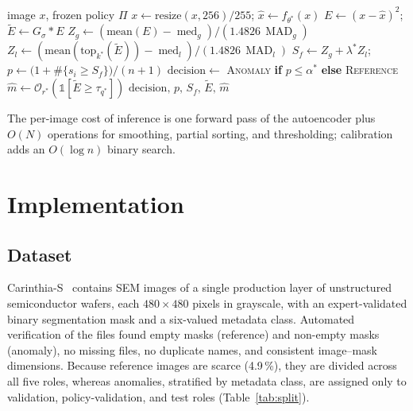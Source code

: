 \documentclass[conference]{IEEEtran}
\newcommand{\Etil}{\tilde{E}}
\DeclareMathOperator{\med}{med}
\DeclareMathOperator{\MAD}{MAD}
\begin{document}
\begin{algorithm}[t]
\caption{RCC-ConvAE screening of a new SEM image}
\label{alg:infer}
\footnotesize
\begin{algorithmic}[1]
\Require image $x$, frozen policy $\Pi$
\State $x\gets\mathrm{resize}(x,256)/255$;\; $\hat x\gets f_{\theta^*}(x)$
\State $E\gets(x-\hat x)^2$;\; $\Etil\gets G_\sigma*E$
\State $Z_g\gets(\mathrm{mean}(E)-\med_g)/(1.4826\,\MAD_g)$
\State $Z_l\gets(\mathrm{mean}(\mathrm{top}_{k^*}(\Etil))-\med_l)/(1.4826\,\MAD_l)$
\State $S_f\gets Z_g+\lambda^* Z_l$;\; $p\gets\big(1+\#\{s_i\ge S_f\}\big)/(n+1)$
\State $\mathrm{decision}\gets$ \textsc{Anomaly} \textbf{if} $p\le\alpha^*$ \textbf{else} \textsc{Reference}
\State $\hat m\gets\mathcal{O}_{r^*}(\mathbb{1}[\Etil\ge\tau_{q^*}])$
\State \Return $\mathrm{decision},\,p,\,S_f,\,\Etil,\,\hat m$
\end{algorithmic}
\end{algorithm}

The per-image cost of inference is one forward pass of the autoencoder plus $O(N)$ operations for smoothing, partial sorting, and thresholding; calibration adds an $O(\log n)$ binary search.

\section{Implementation}
\subsection{Dataset}
Carinthia-S~\cite{carinthia2025} contains \NImages{} SEM images of a single production layer of unstructured semiconductor wafers, each $480\times480$ pixels in grayscale, with an expert-validated binary segmentation mask and a six-valued metadata class. Automated verification of the files found \NRef{} empty masks (reference) and \NAnom{} non-empty masks (anomaly), no missing files, no duplicate names, and consistent image--mask dimensions. Because reference images are scarce (4.9\,\%), they are divided across all five roles, whereas anomalies, stratified by metadata class, are assigned only to validation, policy-validation, and test roles (Table~\ref{tab:split}).

\begin{table}[t]
\centering
\caption{Leakage-free five-role split (seed 42)}
\label{tab:split}

\end{table}
\end{document}
